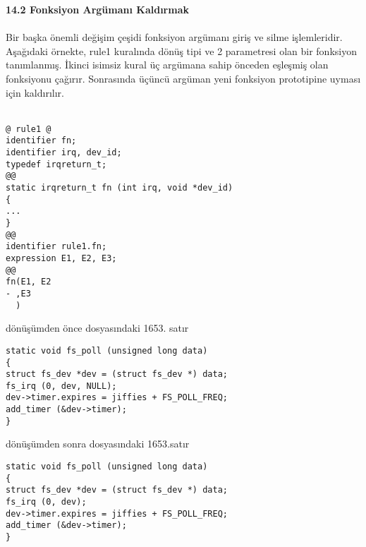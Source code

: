 \documentclass[22pt]{article}
\begin{document}
\textbf{14.2 Fonksiyon Argümanı Kaldırmak}\\
\\
Bir başka önemli değişim çeşidi fonksiyon argümanı giriş ve silme işlemleridir. Aşağıdaki örnekte, rule1 kuralında dönüş tipi ve 2 parametresi olan bir fonksiyon tanımlanmış. İkinci isimsiz kural üç argümana sahip önceden eşleşmiş olan fonksiyonu çağırır. Sonrasında üçüncü argüman yeni fonksiyon prototipine uyması için kaldırılır.\\
\\

\begin{lstlisting}
@ rule1 @
identifier fn;
identifier irq, dev_id;
typedef irqreturn_t;
@@
static irqreturn_t fn (int irq, void *dev_id)
{
...
}
@@
identifier rule1.fn;
expression E1, E2, E3;
@@
fn(E1, E2
- ,E3
  )
\end{lstlisting}
dönüşümden önce  dosyasındaki 1653. satır\\
\begin{lstlisting}
static void fs_poll (unsigned long data)
{
struct fs_dev *dev = (struct fs_dev *) data;
fs_irq (0, dev, NULL);
dev->timer.expires = jiffies + FS_POLL_FREQ;
add_timer (&dev->timer);
}
\end{lstlisting}
dönüşümden sonra  dosyasındaki 1653.satır\\
\begin{lstlisting}
static void fs_poll (unsigned long data)
{
struct fs_dev *dev = (struct fs_dev *) data;
fs_irq (0, dev);
dev->timer.expires = jiffies + FS_POLL_FREQ;
add_timer (&dev->timer);
}
\end{lstlisting}
\end{document}
